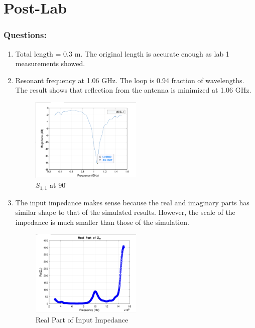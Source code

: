 \documentclass{article} %
\begin{document}
\section*{Post-Lab}
\subsubsection*{Questions:}
\begin{enumerate}
    \item Total length = 0.3 m. The original length is accurate enough as lab 1 measurements showed.
    \item Resonant frequency at 1.06 GHz. The loop is 0.94 fraction of wavelengths. The result shows that reflection from the antenna is minimized at 1.06 GHz.
          \begin{figure}[H]
              \centering
              \includegraphics[width=0.5\textwidth]{./image/figure10.png}
              \caption{$S_{1, 1}$ at $90^{\circ}$}
          \end{figure}
    \item The input impedance makes sense because the real and imaginary parts has similar shape to that of the simulated results. However, the scale of the impedance is much smaller than those of the simulation.
          \begin{figure}[H]
              \centering
              \includegraphics[width=0.5\textwidth]{./image/figure11.png}
              \caption{Real Part of Input Impedance}
          \end{figure}

\end{enumerate}
\end{document}
